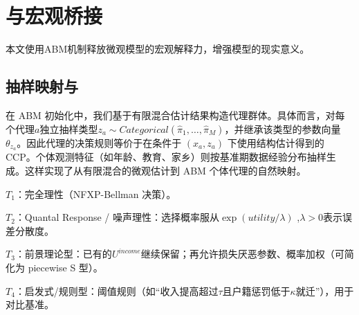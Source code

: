 \documentclass[master, final]{zufe-thesis}
\begin{document}






\chapter{与宏观桥接} %
\label{sec:与宏观桥接}

本文使用ABM机制释放微观模型的宏观解释力，增强模型的现实意义。


\section{抽样映射与} %
\label{sub:抽样映射与}


在 ABM 初始化中，我们基于有限混合估计结果构造代理群体。具体而言，对每个代理$a$独立抽样类型$z_a\sim Categorical(\hat \pi_1,\dots,\hat \pi_M)$，并继承该类型的参数向量 $\theta_{z_a}$。因此代理的决策规则等价于在条件于 $(x_a,z_a)$ 下使用结构估计得到的 CCP。个体观测特征（如年龄、教育、家乡）则按基准期数据经验分布抽样生成。这样实现了从有限混合的微观估计到 ABM 个体代理的自然映射。


$𝑇_1$：完全理性（NFXP-Bellman 决策）。

$𝑇_2$：Quantal Response / 噪声理性：选择概率服从$\exp(utility/\lambda)$ ,$\lambda>0$表示误差分散度。

$𝑇_3$：前景理论型：已有的$U^{income}$继续保留；再允许损失厌恶参数、概率加权（可简化为 piecewise S 型）。

$T_4$：启发式/规则型：阈值规则（如“收入提高超过$\tau$且户籍惩罚低于$\kappa$就迁”），用于对比基准。
\end{document}
